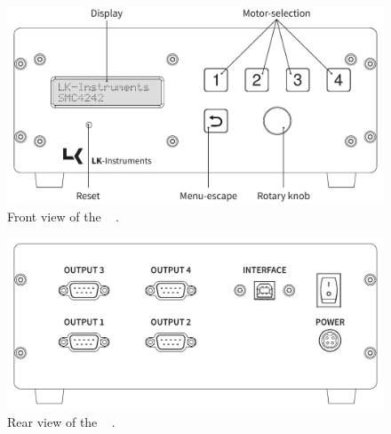 \begin{figure}[h]
  \centering
  \includegraphics[angle=0,origin=c,width=1\textwidth]{./grafiken/MG22131_front_text_2.pdf}
  \caption[Front view of the \productNumber ~\productName.]{Front view of
  the \productNumber ~    \productName.}
  \label{frontpanel}
\end{figure}

\begin{figure}[h]
  \centering
  \includegraphics[angle=0,origin=c,width=1\textwidth]{./grafiken/MG22131_back_text.pdf}
  \caption[Rear view of the \productNumber ~\productName.]{Rear view of
  the \productNumber ~    \productName.}
  \label{frontpanel}
\end{figure}



